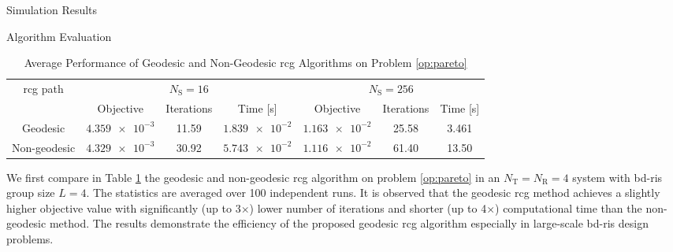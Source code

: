 \documentclass[journal]{IEEEtran}
\begin{document}
\begin{section}{Simulation Results}
	\begin{subsection}{Algorithm Evaluation}
		\begin{table}[!t]
			\caption{Average Performance of Geodesic and Non-Geodesic \gls{rcg} Algorithms on Problem \eqref{op:pareto}}
			\label{tb:complexity_test}
			\centering
			\begin{tabular}{ccccccc}
				\toprule
				\multirow{2}{*}{\gls{rcg} path} & \multicolumn{3}{c}{$N_\mathrm{S}=16$} & \multicolumn{3}{c}{$N_\mathrm{S}=256$}                                                               \\ \cmidrule(lr){2-4} \cmidrule(lr){5-7}
												& Objective                             & Iterations                             & Time [s]         & Objective        & Iterations & Time [s] \\ \midrule
				Geodesic                        & $\num{4.359e-3}$                      & 11.59                                  & $\num{1.839e-2}$ & $\num{1.163e-2}$ & 25.58      & 3.461    \\
				Non-geodesic                    & $\num{4.329e-3}$                      & 30.92                                  & $\num{5.743e-2}$ & $\num{1.116e-2}$ & 61.40      & 13.50    \\ \bottomrule
			\end{tabular}
		\end{table}
		We first compare in Table \ref{tb:complexity_test} the geodesic and non-geodesic \gls{rcg} algorithm on problem \eqref{op:pareto} in an $N_\mathrm{T}=N_\mathrm{R}=4$ system with \gls{bd}-\gls{ris} group size $L=4$.
		The statistics are averaged over \num{100} independent runs.
		It is observed that the geodesic \gls{rcg} method achieves a slightly higher objective value with significantly (up to 3$\times$) lower number of iterations and shorter (up to 4$\times$) computational time than the non-geodesic method.
		The results demonstrate the efficiency of the proposed geodesic \gls{rcg} algorithm especially in large-scale \gls{bd}-\gls{ris} design problems.
	\end{subsection}


\end{section}
\end{document}
